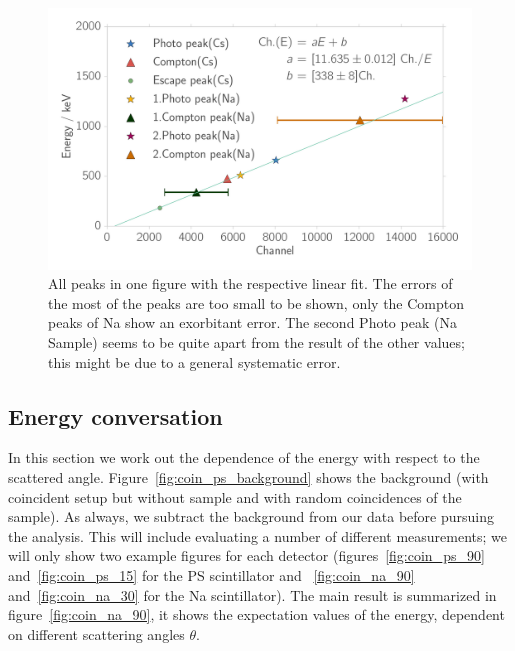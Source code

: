 \begin{figure}[htpb]
    \centering
    \includegraphics[width=0.9\linewidth]{./analysis/figures/calibration_na_linear_fit}
    \caption{All peaks in one figure with the respective linear fit. The errors of
    the most of the peaks are too small to be shown, only the Compton peaks of Na show
    an exorbitant error. The second Photo peak (Na Sample) seems to be quite apart from
    the result of the other values; this might be due to a general systematic error.}
\label{fig:calibration_na_linear_fit}
\end{figure}
\clearpage
\subsection{Energy conversation}
\label{sub:energy_conversation}
In this section we work out the dependence of the energy with respect to the scattered
angle. Figure~\ref{fig:coin_ps_background} shows the background (with
coincident setup but without sample and with random coincidences of the sample).
As always, we subtract the background from our data before pursuing the analysis.
This will include evaluating a number of different measurements; we will
only show two example figures for each detector 
(figures~\ref{fig:coin_ps_90} and~\ref{fig:coin_ps_15} for the PS scintillator and 
~\ref{fig:coin_na_90} and~\ref{fig:coin_na_30} for the Na scintillator). The main
result is summarized in figure~\ref{fig:coin_na_90}, it shows the expectation values of
the energy, dependent on different scattering angles $\theta$.


